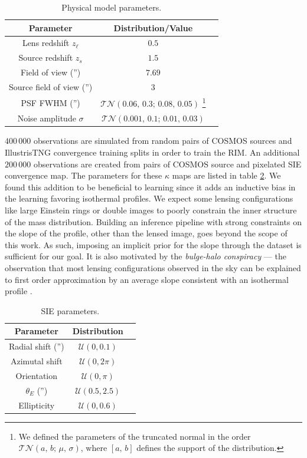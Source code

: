 \begin{table}[htb!]
\centering
\caption{Physical model parameters.}
\label{tab:phys}
\begin{tabular}{ccc}
        Parameter &  Distribution/Value \\
        \hline \hline
        Lens redshift $z_\ell$ & $0.5$ \\
        Source redshift $z_s$ & $1.5$ \\
        Field of view ('') & $7.69$ \\
        Source field of view ('') & $3$ \\
        PSF FWHM ('') & $\mathcal{TN}(0.06,\, 0.3;\, 0.08,\, 0.05)$
        \footnote{We defined the parameters of the truncated normal in the order $\mathcal{TN}(a,\, b;\, \mu,\, \sigma)$, where $[a,\, b]$ defines the support of the distribution.} \\
        Noise amplitude $\sigma$ & $\mathcal{TN}(0.001,\, 0.1;\, 0.01,\,0.03)$\\
        \hline
\end{tabular}
\end{table}

$400\,000$ observations are simulated from random pairs of COSMOS sources 
and IllustrisTNG convergence training splits in order to train the RIM. 
An additional $200\,000$ observations are created from pairs 
of COSMOS source and pixelated SIE convergence map. 
The parameters for these $\kappa$ maps are listed in table \ref{tab:sie}. 
We found this addition to be beneficial to learning since it adds an 
inductive bias in the learning favoring isothermal profiles.
We expect some lensing configurations like 
large Einstein rings or double images to poorly constrain the inner structure of the 
mass distribution. 
Building an inference pipeline with strong constraints on the 
slope of the profile, other than the lensed image, goes beyond the scope of this work. 
As such, imposing an implicit prior for the slope through 
the dataset is sufficient for our goal. 
It is also motivated by the \textit{bulge-halo conspiracy} --- 
the observation that most lensing configurations observed in the sky can be explained 
to first order approximation by 
an average slope consistent with an isothermal profile \citep{Auger2010,Dutton2014}.

\begin{table}[htb!]
\centering
\caption{SIE parameters.}
\label{tab:sie}
\begin{tabular}{ccc}
        Parameter &  Distribution \\
        \hline \hline
         Radial shift ('') & $\mathcal{U}(0, 0.1)$ \\
        Azimutal shift & $\mathcal{U}(0, 2\pi)$ \\
        Orientation & $\mathcal{U}(0, \pi)$ \\
        $\theta_E$ ('') & $\mathcal{U}(0.5, 2.5)$ \\
        Ellipticity & $\mathcal{U}(0, 0.6)$ \\
        \hline
\end{tabular}
\end{table}


